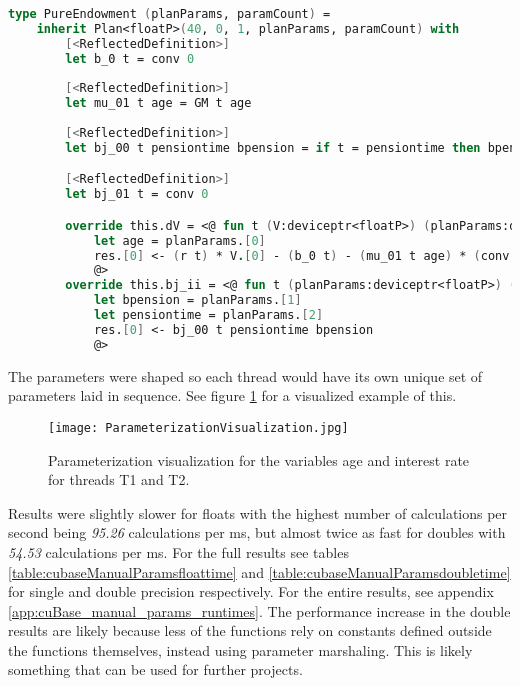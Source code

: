 \begin{lstlisting}[language=FSharp, caption=Parameterized pure endowment life insurance plan in F\# Alea.cuBase, label=cubase_pureendowmentparams]
type PureEndowment (planParams, paramCount) =
	inherit Plan<floatP>(40, 0, 1, planParams, paramCount) with
		[<ReflectedDefinition>]
		let b_0 t = conv 0
    
		[<ReflectedDefinition>]
		let mu_01 t age = GM t age
    
		[<ReflectedDefinition>]
		let bj_00 t pensiontime bpension = if t = pensiontime then bpension else conv 0

		[<ReflectedDefinition>]
		let bj_01 t = conv 0

		override this.dV = <@ fun t (V:deviceptr<floatP>) (planParams:deviceptr<floatP>) (res:deviceptr<floatP>) -> 
			let age = planParams.[0]
			res.[0] <- (r t) * V.[0] - (b_0 t) - (mu_01 t age) * (conv 0 - V.[0] + (bj_01 t))
			@>
		override this.bj_ii = <@ fun t (planParams:deviceptr<floatP>) (res:deviceptr<floatP>) -> 
			let bpension = planParams.[1]                
			let pensiontime = planParams.[2]
			res.[0] <- bj_00 t pensiontime bpension
			@>
\end{lstlisting}

The parameters were shaped so each thread would have its own unique set of parameters laid in sequence. 
See figure \ref{fig:ParameterizationVisualization} for a visualized example of this.

\begin{figure}[h!]\centering
\texttt{[image: ParameterizationVisualization.jpg]}
\caption{Parameterization visualization for the variables age and interest rate for threads T1 and T2.\label{fig:ParameterizationVisualization}}
\end{figure}

Results were slightly slower for floats with the highest number of calculations per second being \emph{95.26} calculations per ms, but almost twice as fast for doubles with \emph{54.53} calculations per ms. 
For the full results see tables \ref{table:cubaseManualParamsfloattime} and \ref{table:cubaseManualParamsdoubletime} for single and double precision respectively.
For the entire results, see appendix \ref{app:cuBase_manual_params_runtimes}.
The performance increase in the double results are likely because less of the functions rely on constants defined outside the functions themselves, instead using parameter marshaling. %
This is likely something that can be used for further projects. %

